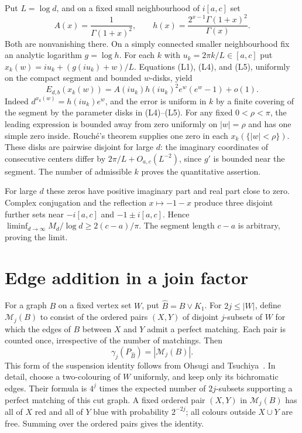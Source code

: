 \documentclass[11pt,a4paper]{article}
\theoremstyle{definition}\newtheorem{problem}[theorem]{Problem}
\begin{document}
Put $L=\log d$, and on a fixed small neighbourhood of $i[a,c]$ set
\[
 A(x)=\frac1{\Gamma(1+x)^2},\qquad
 h(x)=\frac{2^{x-1}\Gamma(1+x)^2}{\Gamma(x)}.
\]
Both are nonvanishing there. On a simply connected smaller
neighbourhood fix an analytic logarithm $g=\log h$.
For each $k$ with $u_k=2\pi k/L\in[a,c]$ put
$x_k(w)=iu_k+(g(iu_k)+w)/L$.
Equations (L1), (L4), and (L5), uniformly on the compact segment
and bounded $w$-disks, yield
\[
 E_{d,b}(x_k(w))
   = A(iu_k)h(iu_k)^2 e^w(e^w-1)+o(1).
\]
Indeed $d^{x_k(w)}=h(iu_k)e^w$, and the error is uniform in $k$
by a finite covering of the segment by the parameter disks
in (L4)--(L5). For any fixed $0<\rho<\pi$, the leading expression
is bounded away from zero uniformly on $|w|=\rho$ and has one
simple zero inside. Rouch\'e's theorem supplies one zero in each
$x_k(\{|w|<\rho\})$. These disks are pairwise disjoint for large $d$:
the imaginary coordinates of consecutive centers differ by
$2\pi/L+O_{a,c}(L^{-2})$, since $g'$ is bounded near the segment.
The number of admissible $k$ proves the quantitative assertion.

For large $d$ these zeros have positive imaginary part and real part
close to zero. Complex conjugation and the reflection $x\mapsto-1-x$
produce three disjoint further sets near $-i[a,c]$ and
$-1\pm i[a,c]$. Hence
$\liminf_{d\to\infty} M_d/\log d\ge 2(c-a)/\pi$.
The segment length $c-a$ is arbitrary, proving the limit.

\section{Edge addition in a join factor}
For a graph $B$ on a fixed vertex set $W$, put $\widehat B=B\vee K_1$. For $2j\le |W|$, define $\mathcal M_j(B)$ to consist of the ordered pairs $(X,Y)$ of disjoint $j$-subsets of $W$ for which the edges of $B$ between $X$ and $Y$ admit a perfect matching. Each pair is counted once, irrespective of the number of matchings. Then
\[
 \gamma_j(P_{\widehat B})=|\mathcal M_j(B)|.
\]
This form of the suspension identity follows from Ohsugi and Tsuchiya~\cite[Theorem~3.1 and Proposition~4.1]{OTmatch}. In detail, choose a two-colouring of $W$ uniformly, and keep only its bichromatic edges. Their formula is $4^j$ times the expected number of $2j$-subsets supporting a perfect matching of this cut graph. A fixed ordered pair $(X,Y)$ in $\mathcal M_j(B)$ has all of $X$ red and all of $Y$ blue with probability $2^{-2j}$; all colours outside $X\cup Y$ are free. Summing over the ordered pairs gives the identity.
\end{document}
